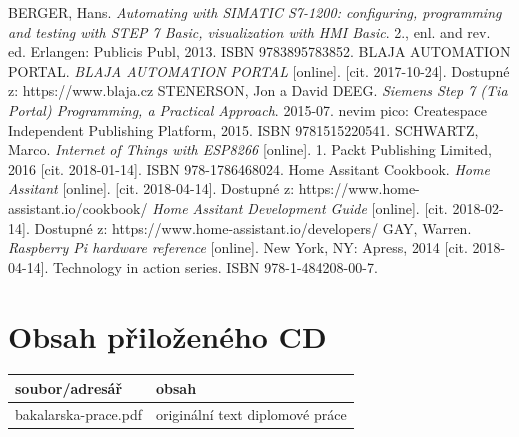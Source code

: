 \documentclass[a4paper,12pt,czech,bibliography=totoc]{scrbook}
\begin{document}
\begin{thebibliography}{99}	
BERGER, Hans. \textit{Automating with SIMATIC S7-1200: configuring, programming and testing with STEP 7 Basic, visualization with HMI Basic}. 2., enl. and rev. ed. Erlangen: Publicis Publ, 2013. ISBN 9783895783852.
BLAJA AUTOMATION PORTAL. \textit{BLAJA AUTOMATION PORTAL} [online]. [cit. 2017-10-24]. Dostupné z: https://www.blaja.cz
STENERSON, Jon a David DEEG. \textit{Siemens Step 7 (Tia Portal) Programming, a Practical Approach}. 2015-07. nevim pico: Createspace Independent Publishing Platform, 2015. ISBN 9781515220541.
SCHWARTZ, Marco. \textit{Internet of Things with ESP8266} [online]. 1. Packt Publishing Limited, 2016 [cit. 2018-01-14]. ISBN 978-1786468024.
Home Assitant Cookbook. \textit{Home Assitant} [online]. [cit. 2018-04-14]. Dostupné z: https://www.home-assistant.io/cookbook/
\textit{Home Assitant Development Guide} [online]. [cit. 2018-02-14]. Dostupné z: https://www.home-assistant.io/developers/
GAY, Warren. \textit{Raspberry Pi hardware reference} [online]. New York, NY: Apress, 2014 [cit. 2018-04-14]. Technology in action series. ISBN 978-1-484208-00-7.
\end{thebibliography}

\listoffigures



\appendix


\chapter{Obsah přiloženého CD}

\begin{tabular}{lp{8cm}}
  \hline
  soubor/adresář     &  obsah  \\
  \hline
  bakalarska-prace.pdf   &   originální text diplomové práce \\
\end{tabular}
\end{document}
